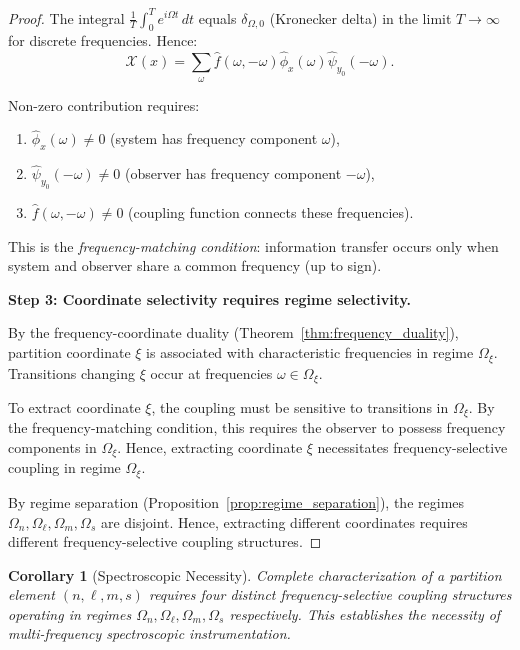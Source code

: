 \documentclass[twocolumn,10pt,a4paper]{article}
\newtheorem{corollary}[theorem]{Corollary}
\theoremstyle{remark}
\begin{document}
\begin{proof}
The integral $\frac{1}{T} \int_0^T e^{i\Omega t} \, dt$ equals $\delta_{\Omega, 0}$ (Kronecker delta) in the limit $T \to \infty$ for discrete frequencies. Hence:
\begin{equation}
\mathcal{X}(x) = \sum_{\omega} \hat{f}(\omega, -\omega) \hat{\phi}_x(\omega) \hat{\psi}_{y_0}(-\omega).
\end{equation}

Non-zero contribution requires:
\begin{enumerate}[label=(\alph*), noitemsep]
    \item $\hat{\phi}_x(\omega) \neq 0$ (system has frequency component $\omega$),
    \item $\hat{\psi}_{y_0}(-\omega) \neq 0$ (observer has frequency component $-\omega$),
    \item $\hat{f}(\omega, -\omega) \neq 0$ (coupling function connects these frequencies).
\end{enumerate}

This is the \emph{frequency-matching condition}: information transfer occurs only when system and observer share a common frequency (up to sign).

\textbf{Step 3: Coordinate selectivity requires regime selectivity.}

By the frequency-coordinate duality (Theorem~\ref{thm:frequency_duality}), partition coordinate $\xi$ is associated with characteristic frequencies in regime $\Omega_\xi$. Transitions changing $\xi$ occur at frequencies $\omega \in \Omega_\xi$.

To extract coordinate $\xi$, the coupling must be sensitive to transitions in $\Omega_\xi$. By the frequency-matching condition, this requires the observer to possess frequency components in $\Omega_\xi$. Hence, extracting coordinate $\xi$ necessitates frequency-selective coupling in regime $\Omega_\xi$.

By regime separation (Proposition~\ref{prop:regime_separation}), the regimes $\Omega_n, \Omega_\ell, \Omega_m, \Omega_s$ are disjoint. Hence, extracting different coordinates requires different frequency-selective coupling structures.
\end{proof}

\begin{corollary}[Spectroscopic Necessity]
\label{cor:spectroscopic_necessity}
Complete characterization of a partition element $(n, \ell, m, s)$ requires four distinct frequency-selective coupling structures operating in regimes $\Omega_n, \Omega_\ell, \Omega_m, \Omega_s$ respectively. This establishes the necessity of multi-frequency spectroscopic instrumentation.
\end{corollary}
\end{document}
